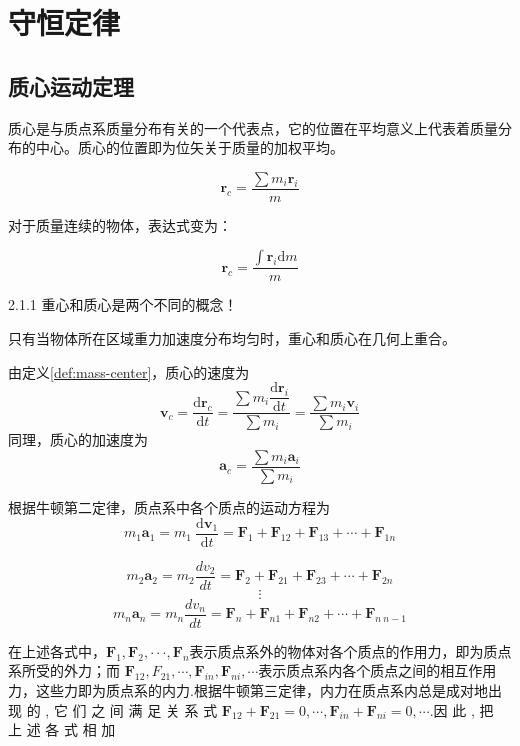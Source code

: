 \chapter{守恒定律}
\section{质心运动定理}
\begin{definition}[质心]
    质心是与质点系质量分布有关的一个代表点，它的位置在平均意义上代表着质量分布的中心。质心的位置即为位矢关于质量的加权平均。

    \[
        \boldsymbol{r}_c =\dfrac{\sum m_i\boldsymbol{r}_i }{m}
    \]

    对于质量连续的物体，表达式变为：

    \[
        \boldsymbol{r}_c =\dfrac{\int \boldsymbol{r}_i \mathrm{d}m}{m}
    \]
    
\end{definition}
\label{def:mass-center}
\begin{attention}{ }{2.1.1}
    重心和质心是两个不同的概念！

    只有当物体所在区域重力加速度分布均匀时，重心和质心在几何上重合。

\end{attention}

由定义\ref{def:mass-center}，质心的速度为
\[
    \boldsymbol{v}_c=\dfrac{\mathrm{d}\boldsymbol{r}_c}{\mathrm{d}t}=\dfrac{\sum m_i\dfrac{\mathrm{d}\boldsymbol{r}_i}{\mathrm{d}t}}{\sum m_i}=\dfrac{\sum m_i\boldsymbol{v}_i}{\sum m_i}
\]
同理，质心的加速度为
\[
    \boldsymbol{a}_c=\dfrac{\sum m_i\boldsymbol{a}_i}{\sum m_i}
\]

根据牛顿第二定律，质点系中各个质点的运动方程为
$$m_{1}\boldsymbol{a}_{1}=m_{1}\:\frac{\mathrm{d}\boldsymbol{v}_{1}}{\mathrm{d}t}=\boldsymbol{F}_{1}+\boldsymbol{F}_{12}+\boldsymbol{F}_{13}+\cdots+\boldsymbol{F}_{1n}$$


$$m_{2}\boldsymbol{a}_{2}=m_{2}\frac{dv_{2}}{dt}=\boldsymbol{F}_{2}+\boldsymbol{F}_{21}+\boldsymbol{F}_{23}+\cdots+\boldsymbol{F}_{2n}$$
$$\vdots$$
$$m_{n}\boldsymbol{a}_{n}=m_{n}\frac{dv_{n}}{dt}=\boldsymbol{F}_{n}+\boldsymbol{F}_{n1}+\boldsymbol{F}_{n2}+\cdots+\boldsymbol{F}_{n\:n-1}$$


在上述各式中，$\boldsymbol{F}_1,\boldsymbol{F}_2,\cdotp\cdotp\cdotp,\boldsymbol{F}_n$表示质点系外的物体对各个质点的作用力，即为质点系所受的外力；而 $\boldsymbol{F}_{12},F_{21},\cdots,\boldsymbol{F}_{in},\boldsymbol{F}_{ni},\cdots$表示质点系内各个质点之间的相互作用力，这些力即为质点系的内力.根据牛顿第三定律，内力在质点系内总是成对地出 现 的 , 它 们 之 间 满 足 关 系 式 $\boldsymbol{F}_{12}+ \boldsymbol{F}_{21}= 0, \cdots , \boldsymbol{F}_{in}+ \boldsymbol{F}_{ni}= 0, \cdots .$因 此 , 把 上 述 各 式 相 加

